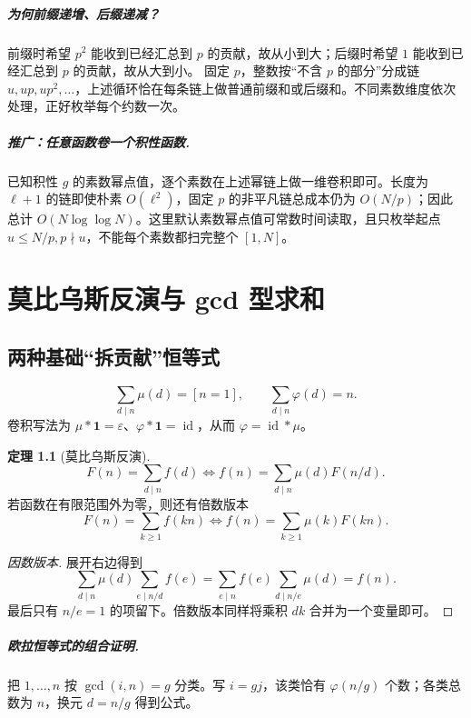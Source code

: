 \documentclass[UTF8,a4paper,11pt,oneside,openany,fontset=fandol]{ctexbook}
\theoremstyle{definition}
\newtheorem{theorem}[definition]{定理}
\newcommand{\eps}{\varepsilon}
\newcommand{\one}{\mathbf 1}
\newcommand{\id}{\operatorname{id}}
\begin{document}
\paragraph{为何前缀递增、后缀递减？}
前缀时希望 $p^2$ 能收到已经汇总到 $p$ 的贡献，故从小到大；后缀时希望 $1$ 能收到已经汇总到 $p$ 的贡献，故从大到小。
固定 $p$，整数按“不含 $p$ 的部分”分成链 $u,up,up^2,\ldots$，上述循环恰在每条链上做普通前缀和或后缀和。不同素数维度依次处理，正好枚举每个约数一次。

\paragraph{推广：任意函数卷一个积性函数.}
已知积性 $g$ 的素数幂点值，逐个素数在上述幂链上做一维卷积即可。长度为 $\ell+1$ 的链即使朴素 $O(\ell^2)$，固定 $p$ 的非平凡链总成本仍为 $O(N/p)$；因此总计 $O(N\log\log N)$。这里默认素数幂点值可常数时间读取，且只枚举起点 $u\le N/p,p\nmid u$，不能每个素数都扫完整个 $[1,N]$。



\chapter{莫比乌斯反演与 gcd 型求和}
\section{两种基础“拆贡献”恒等式}
\[
\sum_{d\mid n}\mu(d)=[n=1],\qquad
\sum_{d\mid n}\varphi(d)=n.
\]
卷积写法为 $\mu*\one=\eps$、$\varphi*\one=\id$，从而 $\varphi=\id*\mu$。
\begin{theorem}[莫比乌斯反演]
\[
 F(n)=\sum_{d\mid n}f(d)
 \iff f(n)=\sum_{d\mid n}\mu(d)F(n/d).
\]
若函数在有限范围外为零，则还有倍数版本
\[
 F(n)=\sum_{k\ge1}f(kn)
 \iff f(n)=\sum_{k\ge1}\mu(k)F(kn).
\]
\end{theorem}

\begin{proof}[因数版本]
展开右边得到
\[
\sum_{d\mid n}\mu(d)\sum_{e\mid n/d}f(e)
=\sum_{e\mid n}f(e)\sum_{d\mid n/e}\mu(d)=f(n).
\]
最后只有 $n/e=1$ 的项留下。倍数版本同样将乘积 $dk$ 合并为一个变量即可。
\end{proof}
\paragraph{欧拉恒等式的组合证明.}
把 $1,\ldots,n$ 按 $\gcd(i,n)=g$ 分类。写 $i=gj$，该类恰有 $\varphi(n/g)$ 个数；各类总数为 $n$，换元 $d=n/g$ 得到公式。
\end{document}
